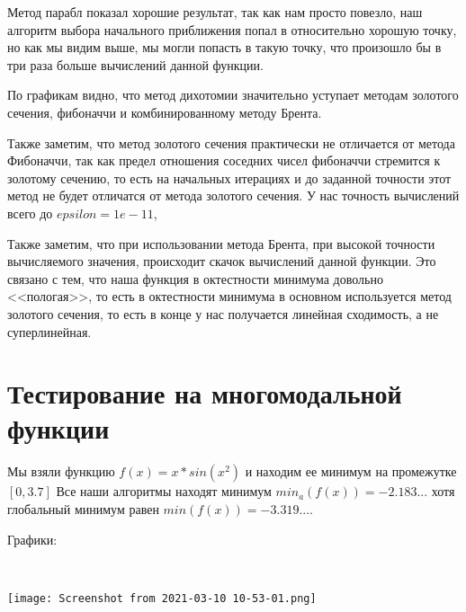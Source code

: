 Метод парабл показал хорошие результат, так как нам просто повезло,
наш алгоритм выбора начального приближения попал в относительно хорошую точку, но как мы видим выше, 
мы могли попасть в такую точку, что произошло бы в три раза больше вычислений данной функции.

По графикам видно, что метод дихотомии значительно уступает
методам золотого сечения, фибоначчи и комбинированному методу Брента.

Также заметим, что метод золотого сечения практически не отличается от метода
Фибоначчи, так как предел отношения соседних чисел фибоначчи стремится к золотому сечению,
то есть на начальных итерациях и до заданной точности этот метод не будет отличатся от 
метода золотого сечения. У нас точность вычислений всего до $epsilon = 1e-11$, 

Также заметим, что при использовании метода Брента, при высокой точности вычисляемого значения, происходит
скачок вычислений данной функции. Это связано с тем, что наша функция в октестности минимума довольно <<пологая>>,
то есть в октестности минимума в основном используется метод золотого сечения, то есть в конце у нас получается
линейная сходимость, а не суперлинейная.

\newpage
\section {Тестирование на многомодальной функции}
Мы взяли функцию 
$f(x) = x * sin(x^2)$
и находим ее минимум на промежутке $[0, 3.7]$
Все наши алгоритмы находят минимум $min_a (f(x)) = -2.183...$
хотя глобальный минимум равен $min(f(x)) = -3.319...$.

Графики:

\ 


\texttt{[image: Screenshot from 2021-03-10 10-53-01.png]}


